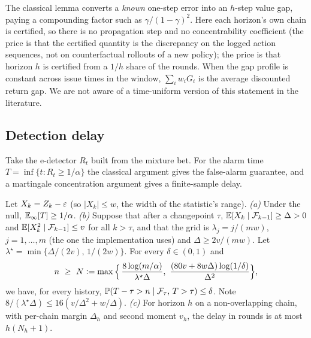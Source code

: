 \begin{remark}
The classical lemma \citep{kearns2002near} converts a \emph{known} one-step error into an $h$-step value gap, paying a compounding factor such as $\gamma/(1-\gamma)^2$.
Here each horizon's own chain is certified, so there is no propagation step and no concentrability coefficient (the price is that the certified quantity is the discrepancy on the logged action sequences, not on counterfactual rollouts of a new policy); the price is that horizon $h$ is certified from a $1/h$ share
of the rounds. When the gap profile is constant across issue times in the window, $\sum_iw_iG_i$ is the average discounted return gap. We are not aware of a
time-uniform version of this statement in the literature.
\end{remark}

\subsection{Detection delay}

Take the e-detector $R_t$ built from the mixture bet. For the alarm time $T=\inf\{t:R_t\ge1/\alpha\}$ the classical argument gives the false-alarm guarantee, and a martingale
concentration argument gives a finite-sample delay.

\begin{theorem}\label{thm:delay}
Let $X_k=Z_k-\varepsilon$ (so $|X_k|\le w$, the width of the statistic's range). \emph{(a)} Under the null, $\mathbb{E}_\infty[T]\ge1/\alpha$. \emph{(b)} Suppose that after a changepoint $\tau$,
$\mathbb{E}[X_k\mid\mathcal{F}_{k-1}]\ge\Delta>0$ and $\mathbb{E}[X_k^2\mid\mathcal{F}_{k-1}]\le v$ for all $k>\tau$, and that the grid is $\lambda_j=j/(mw)$, $j=1,\dots,m$ (the one the implementation uses) and
$\Delta\ge 2v/(mw)$. Let $\lambda^\star=\min\{\Delta/(2v),\,1/(2w)\}$. For every $\delta\in(0,1)$ and
\begin{equation}\label{eq:N}
n\ \ge\ N\defeq\max\Big\{\,\frac{8\log(m/\alpha)}{\lambda^\star\Delta},\ \frac{(80v+8w\Delta)\log(1/\delta)}{\Delta^2}\Big\},
\end{equation}
we have, for every history, $\mathbb{P}(T-\tau>n\mid\mathcal{F}_\tau,\,T>\tau)\le\delta$. Note $8/(\lambda^\star\Delta)\le16(v/\Delta^2+w/\Delta)$.
\emph{(c)} For horizon $h$ on a non-overlapping chain, with per-chain margin $\Delta_h$ and second moment $v_h$, the delay in rounds is at most $h(N_h+1)$.
\end{theorem}

